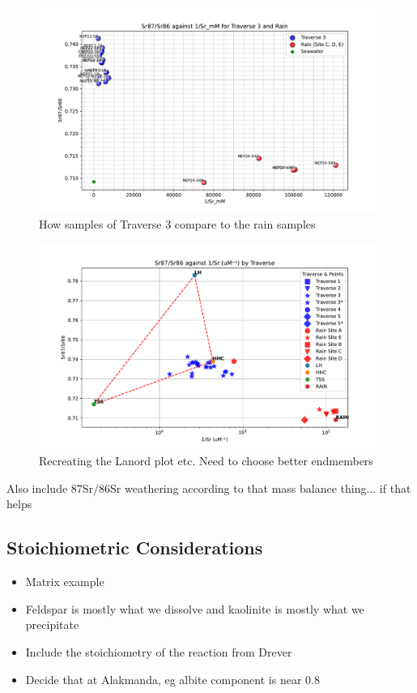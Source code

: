 \begin{figure}[h]
    \centering
    \includegraphics[width=\textwidth]{Sr87_Sr86_1Sr_Rain.pdf}
    \caption{How samples of Traverse 3 compare to the rain samples}
    \label{fig:discussion3}
\end{figure}

\FloatBarrier

\begin{figure}[h]
    \centering
    \includegraphics[width=\textwidth]{Sr87_Sr86_1Sr_Traverse_Triangle.pdf}
    \caption{Recreating the Lanord plot etc. Need to choose better endmembers}
    \label{fig:discussion4}
\end{figure}

Also include 87Sr/86Sr weathering according to that mass balance thing... if that helps

\FloatBarrier




\subsection{Stoichiometric Considerations}
\begin{itemize}
    \item Matrix example
    \item Feldspar is mostly what we dissolve and kaolinite is mostly what we precipitate
    \item Include the stoichiometry of the reaction from Drever
    \item Decide that at Alakmanda, eg albite component is near 0.8

\end{itemize}

